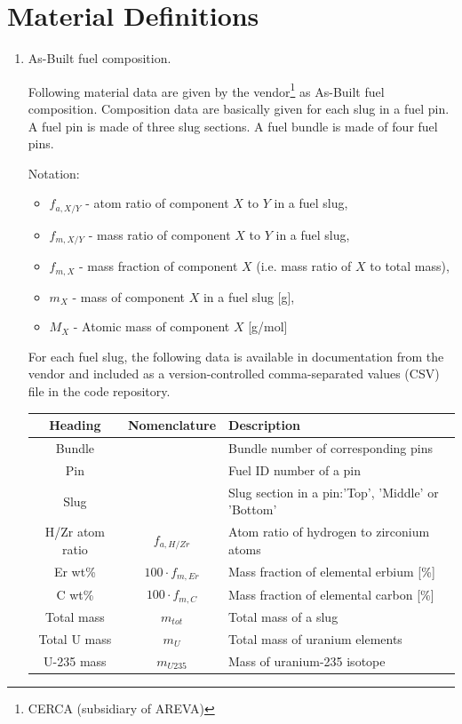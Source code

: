 \documentclass{UWNR_modeling}
\begin{document}
\section{Material Definitions}\label{section:materials}
\begin{enumerate}
\item As-Built fuel composition.

Following material data are given by the vendor\footnote{CERCA (subsidiary of AREVA)} as As-Built fuel composition. Composition data are basically given for each slug in a fuel pin. A fuel pin is made of three slug sections. A fuel bundle is made of four fuel pins.

Notation: 
\begin{itemize}
\item $f_{a,X/Y}$ - atom ratio of component $X$ to $Y$ in a fuel slug,
\item $f_{m,X/Y}$ - mass ratio of component $X$ to $Y$ in a fuel slug,
\item $f_{m,X}$ - mass fraction of component $X$ (i.e. mass ratio of $X$ to total mass),
\item $m_X$ - mass of component $X$ in a fuel slug [g],
\item $M_X$ - Atomic mass of component $X$ [g/mol]
\end{itemize}

For each fuel slug, the following data is available in documentation from the vendor and included as a 
version-controlled comma-separated values (CSV) file in the code repository.

\begin{tabular}{|c|c|l|}
\hline
Heading & Nomenclature & Description \\ \hline
Bundle & & Bundle number of corresponding pins\\
Pin & & Fuel ID number of a pin\\
Slug & & Slug section in a pin:'Top', 'Middle' or 'Bottom'\\
H/Zr atom ratio & $f_{a,H/Zr}$ & Atom ratio of hydrogen to zirconium atoms\\
Er wt\% & $100 \cdot f_{m,Er}$ & Mass fraction of elemental erbium [\%]\\
C wt\% & $100 \cdot f_{m,C}$ & Mass fraction of elemental carbon [\%]\\
Total mass & $m_{tot}$ & Total mass of a slug\\
Total U mass & $m_{U}$ & Total mass of uranium elements\\
U-235 mass & $m_{U235}$ & Mass of uranium-235 isotope\\ \hline
\end{tabular}


\end{enumerate}
\end{document}
